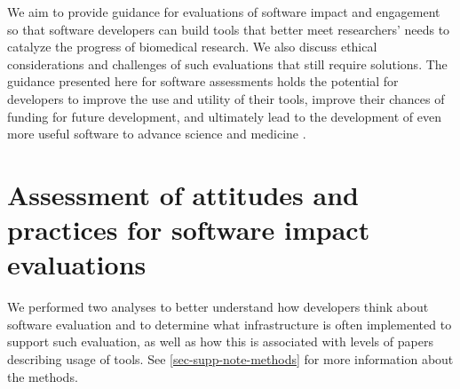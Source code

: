 \documentclass{article}
\begin{document}
We aim to provide guidance for evaluations of software impact and engagement so that software developers can build tools that better meet researchers' needs to catalyze the progress of biomedical research. We also discuss ethical considerations and challenges of such evaluations that still require solutions. The guidance presented here for software assessments holds the potential for developers to improve the use and utility of their tools, improve their chances of funding for future development, and ultimately lead to the development of even more useful software to advance science and medicine \cite{wratten_reproducible_2021}. 



\section{Assessment of attitudes and practices for software impact evaluations}

We performed two analyses to better understand how developers think about software evaluation and to determine what infrastructure is often implemented to support such evaluation, as well as how this is associated with levels of papers describing usage of tools. See \ref{sec-supp-note-methods} for more information about the methods. 
\end{document}
